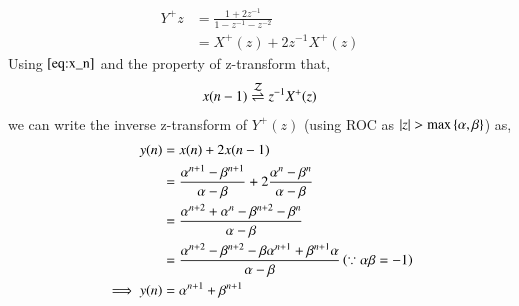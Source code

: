 \documentclass[journal,12pt,twocolumn]{IEEEtran}
\renewcommand\thesection{\arabic{section}}
\begin{document}
\begin{enumerate}[label=\thesection.\arabic*,ref=\thesection.\theenumi]
	 \begin{align} 
             Y^{+}{z} &= \frac{1+ 2z^{-1}}{1-z^{-1}-z^{-2}} \\
	              &= X^{+}(z) + 2z^{-1}X^{+}(z)
	 \end{align}
	Using $\eqref{eq:x_n}$ and the property of z-transform that,
	 \begin{align}
		 x(n-1) \overset{\mathcal{Z}}{ \rightleftharpoons} z^{-1}X^{+}(z)
         \end{align}
      we can write the inverse z-transform of $Y^{+}(z)$ (using ROC as $\left\vert z\right\vert > \text{max}\left\{\alpha,\beta\right\}$) as,
        \begin{align}
		y(n) &= x(n) + 2x(n-1) \\
		     &=  \frac{\alpha^{n+1} - \beta^{n+1}}{\alpha -\beta} + 2 \frac{\alpha^{n} - \beta^{n}}{\alpha -\beta} \\
		     &= \frac{\alpha^{n+2} + \alpha^{n} - \beta^{n+2} - \beta^{n}}{\alpha - \beta} \\
		     &= \frac{\alpha^{n+2} - \beta^{n+2} -\beta\alpha^{n+1} + \beta^{n+1}\alpha}{\alpha-\beta} \left(\because \alpha\beta = -1\right) \\
	 \implies y(n) &= \alpha^{n+1} + \beta^{n+1}
	\end{align}
\end{enumerate}
\end{document}
